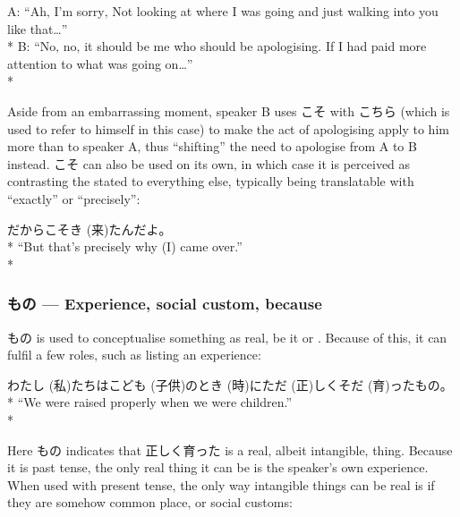 \documentclass[11pt, b5paper, twoside, openright, onecolumn]{book}
\makeatletter
\newcommand*{\rubystack}[2]{{\relscale{0.5}%
  \begin{tabular}[b]{@{}c@{}}%
    {#1}\\%
   {\textscale{2}{#2}}%
  \end{tabular}}%
}
\DeclareRobustCommand*{\ruby}[2]{%
  \mbox{%
    \setlength{\parskip}{0ex}%
    \BeginAccSupp{method=pdfstringdef,ActualText={#1}}%
      \rubystack{\phantom{#2}}{#1}%
      \llap{%
        \rubystack{#2}{\phantom{#1}}%
      }%
    \EndAccSupp{}%
  }%
}
\renewcommand*{\ruby}[2]{#2 (#1)}%
\newenvironment{exampleblock}{
\setlength{\parindent}{0.6in}
\begin{minipage}[t]{\dimexpr\textwidth-\parindent}}
{\end{minipage}}
\makeatother
\begin{document}
\begin{exampleblock}
A: “Ah‚ I’m sorry‚ Not looking at where I was going and just walking into you like that…” \\* 
B: “No‚ no‚ it should be me who should be apologising. If I had paid more attention to what was going on…” \\* 
\end{exampleblock}
\vspace{0.2cm}

Aside from an embarrassing moment‚ speaker B uses こそ with こちら (which is used to refer to himself in this case) to make the act of apologising apply to him more than to speaker A‚ thus “shifting” the need to apologise from A to B instead. こそ can also be used on its own‚ in which case it is perceived as contrasting the stated to everything else‚ typically being translatable with “exactly” or “precisely”:

\vspace{0.4cm}
\begin{exampleblock}
だからこそ\ruby{来}{き}たんだよ。 \\* 
“But that’s precisely why (I) came over.” \\* 
\end{exampleblock}
\subsubsection{もの — Experience‚ social custom‚ because}


もの is used to conceptualise something as real‚ be it  or . Because of this‚ it can fulfil a few roles‚ such as listing an experience:

\vspace{0.4cm}
\begin{exampleblock}
\ruby{私}{わたし}たちは\ruby{子供}{こども}の\ruby{時}{とき}に\ruby{正}{ただ}しく\ruby{育}{そだ}ったもの。 \\* 
“We were raised properly when we were children.” \\* 
\end{exampleblock}
\vspace{0.2cm}

Here もの indicates that 正しく育った is a real‚ albeit intangible‚ thing. Because it is past tense‚ the only real thing it can be is the speaker’s own experience. When used with present tense‚ the only way intangible things can be real is if they are somehow common place‚ or social customs:
\end{document}
